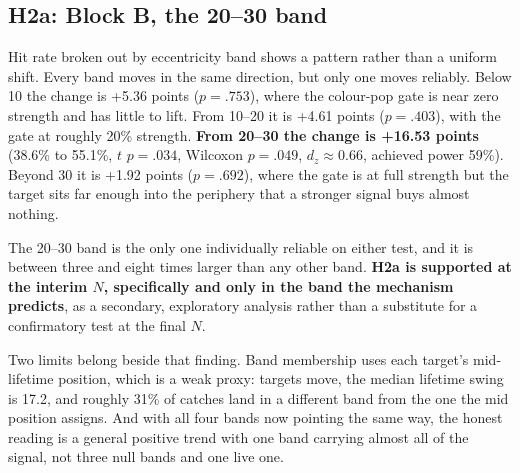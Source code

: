 \subsection{H2a: Block B, the 20--30\textdegree{} band}

Hit rate broken out by eccentricity band shows a pattern rather than a uniform shift. Every band
moves in the same direction, but only one moves reliably. Below 10\textdegree{} the change is +5.36
points ($p = .753$), where the colour-pop gate is near zero strength and has little to lift. From
10--20\textdegree{} it is +4.61 points ($p = .403$), with the gate at roughly 20\% strength.
\textbf{From 20--30\textdegree{} the change is +16.53 points} (38.6\% to 55.1\%, $t$ $p = .034$,
Wilcoxon $p = .049$, $d_z \approx 0.66$, achieved power 59\%). Beyond 30\textdegree{} it is +1.92
points ($p = .692$), where the gate is at full strength but the target sits far enough into the
periphery that a stronger signal buys almost nothing.

The 20--30\textdegree{} band is the only one individually reliable on either test, and it is between
three and eight times larger than any other band. \textbf{H2a is supported at the interim $N$,
specifically and only in the band the mechanism predicts}, as a secondary, exploratory analysis
rather than a substitute for a confirmatory test at the final $N$.

Two limits belong beside that finding. Band membership uses each target's mid-lifetime position,
which is a weak proxy: targets move, the median lifetime swing is 17.2\textdegree{}, and roughly 31\%
of catches land in a different band from the one the mid position assigns. And with all four bands
now pointing the same way, the honest reading is a general positive trend with one band carrying
almost all of the signal, not three null bands and one live one.


